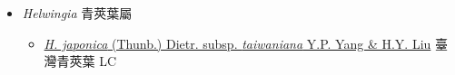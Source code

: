 
  \begin{itemize}
 \item[] \textit{Helwingia} 青莢葉屬
                    
  \begin{itemize}
        \item[] \href{http://www.theplantlist.org/tpl1.1/search?q=Helwingia+japonica+subsp.+taiwaniana}{\textit{H. japonica} (Thunb.) Dietr. subsp. \textit{taiwaniana} Y.P. Yang \& H.Y. Liu}     臺灣青莢葉 LC
  \end{itemize}
  \end{itemize}
